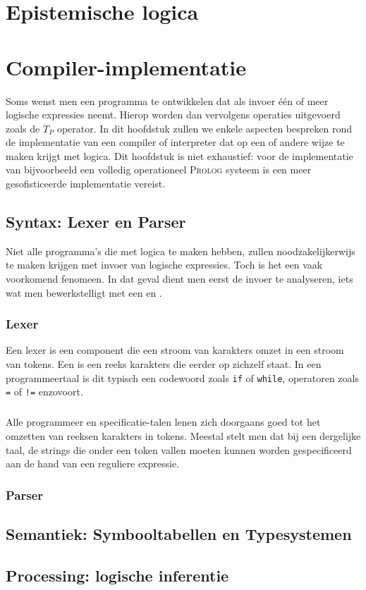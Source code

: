 \documentclass[titlepage,a4paper]{book}
\newcommand{\prolog}{\textsc{Prolog}}
\begin{document}
\chapter{Epistemische logica}
\chapter{Compiler-implementatie}
Soms wenst men een programma te ontwikkelen dat als invoer \'e\'en of meer logische expressies neemt. Hierop worden dan vervolgens operaties uitgevoerd zoals de $T_P$ operator. In dit hoofdstuk zullen we enkele aspecten bespreken rond de implementatie van een compiler of interpreter dat op een of andere wijze te maken krijgt met logica. Dit hoofdstuk is niet exhaustief: voor de implementatie van bijvoorbeeld een volledig operationeel \prolog{} systeem is een meer gesofisticeerde implementatie vereist.
\section{Syntax: Lexer en Parser}
Niet alle programma's die met logica te maken hebben, zullen noodzakelijkerwijs te maken krijgen met invoer van logische expressies. Toch is het een vaak voorkomend fenomeen. In dat geval dient men eerst de invoer te analyseren, iets wat men bewerkstelligt met een  en .
\subsection{Lexer}
Een lexer is een component die een stroom van karakters omzet in een stroom van tokens. Een  is een reeks karakters die eerder op zichzelf staat. In een programmeertaal is dit typisch een codewoord zoals \verb+if+ of \verb+while+, operatoren zoals \verb+=+ of \verb+!=+ enzovoort.
\paragraph{}
Alle programmeer en specificatie-talen lenen zich doorgaans goed tot het omzetten van reeksen karakters in tokens. Meestal stelt men dat bij een dergelijke taal, de strings die onder een token vallen moeten kunnen worden gespecificeerd aan de hand van een reguliere expressie.
\subsection{Parser}
\section{Semantiek: Symbooltabellen en Typesystemen}
\section{Processing: logische inferentie}
\backmatter
\end{document}
